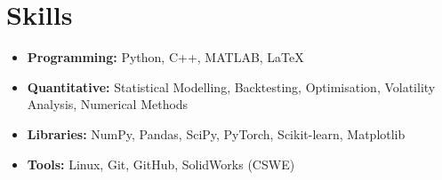 \documentclass[9pt]{article} %
\begin{document}
\section{Skills}

\begin{itemize}[leftmargin=*]
    \item \textbf{Programming:} Python, C++, MATLAB, LaTeX
    \item \textbf{Quantitative:} Statistical Modelling, Backtesting, Optimisation, Volatility Analysis, Numerical Methods
    \item \textbf{Libraries:} NumPy, Pandas, SciPy, PyTorch, Scikit-learn, Matplotlib
    \item \textbf{Tools:} Linux, Git, GitHub, SolidWorks (CSWE)
\end{itemize}
\end{document}

